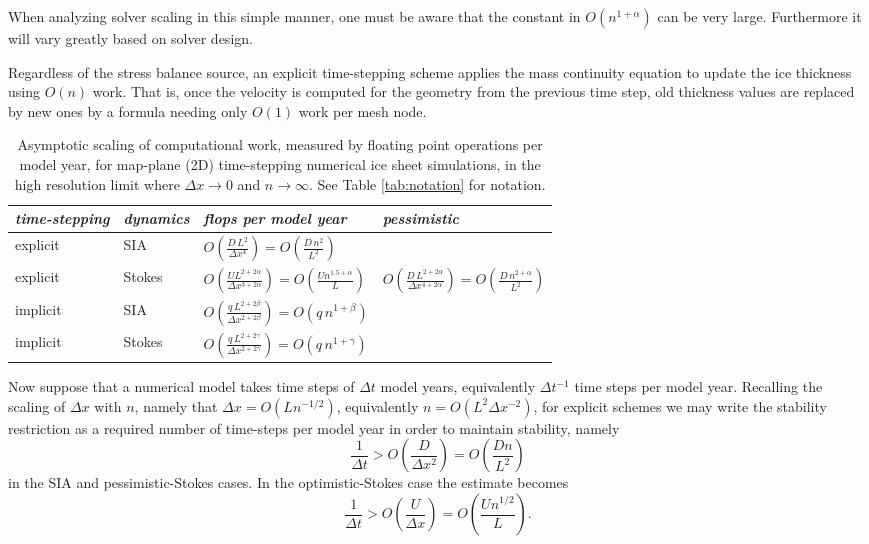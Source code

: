 \documentclass[twocolumn,letterpaper]{igs}
\begin{document}
When analyzing solver scaling in this simple manner, one must be aware that the constant in $O(n^{1+\alpha})$ can be very large.  Furthermore it will vary greatly based on solver design.

Regardless of the stress balance source, an explicit time-stepping scheme applies the mass continuity equation to update the ice thickness using $O(n)$ work.  That is, once the velocity is computed for the geometry from the previous time step, old thickness values are replaced by new ones by a formula needing only $O(1)$ work per mesh node.

\newcommand{\oo}[1]{\displaystyle O\left(#1\right)}
\setlength{\tabcolsep}{5pt}
\renewcommand{\arraystretch}{1.5}
\begin{table*}[ht]
{\normalsize
\begin{tabular}{llll}
\emph{time-stepping} & \emph{dynamics} & \emph{flops per model year} & \emph{pessimistic} \\ \hline
explicit & SIA    & $\oo{\frac{D\, L^2}{\Delta x^4}} = \oo{\frac{D\, n^2}{L^2}}${\Huge \strut} \\
explicit & Stokes & $\oo{\frac{U L^{2+2\alpha}}{\Delta x^{3+2\alpha}}} = \oo{\frac{U n^{1.5+\alpha}}{L}}${\Huge \strut}\phantom{x} & $\oo{\frac{D\, L^{2+2\alpha}}{\Delta x^{4+2\alpha}}} = \oo{\frac{D\,n^{2+\alpha}}{L^2}}$ \\
implicit & SIA    & $\oo{\frac{q\, L^{2+2\beta}}{\Delta x^{2+2\beta}}} = \oo{q\, n^{1+\beta}}${\Huge \strut} \\
implicit & Stokes & $\oo{\frac{q\, L^{2+2\gamma}}{\Delta x^{2+2\gamma}}} = \oo{q\, n^{1+\gamma}}${\Huge \strut}
\end{tabular}
}
\caption{Asymptotic scaling of computational work, measured by floating point operations per model year, for map-plane (2D) time-stepping numerical ice sheet simulations, in the high resolution limit where $\Delta x\to 0$ and $n\to\infty$.  See Table \ref{tab:notation} for notation.}
\label{tab:performancemodel}
\end{table*}

Now suppose that a numerical model takes time steps of $\Delta t$ model years, equivalently $\Delta t^{-1}$ time steps per model year.  Recalling the scaling of $\Delta x$ with $n$, namely that $\Delta x = O(L n^{-1/2})$, equivalently $n=O(L^2 \Delta x^{-2})$, for explicit schemes we may write the stability restriction as a required number of time-steps per model year in order to maintain stability, namely
\begin{equation}
\frac{1}{\Delta t} > \oo{\frac{D}{\Delta x^2}} = \oo{\frac{D n}{L^2}} \label{eq:explicitsiarequired}
\end{equation}
in the SIA and pessimistic-Stokes cases.  In the optimistic-Stokes case the estimate becomes
\begin{equation}
\frac{1}{\Delta t} > \oo{\frac{U}{\Delta x}} = \oo{\frac{U n^{1/2}}{L}}. \label{eq:explicitoptstokesrequired}
\end{equation}
\end{document}
